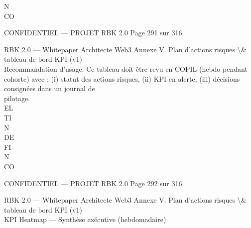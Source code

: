 N\\
CO\\
\vspace{0.5em}
\vspace{0.5em}
\vspace{0.5em}
\vspace{0.5em}
\begin{confidential}CONFIDENTIEL — PROJET RBK 2.0                                               Page 291 sur 316\end{confidential}
RBK 2.0 — Whitepaper Architecte Web3                                                                          Annexe V. Plan d’actions risques \textbackslash{}& tableau de bord KPI (v1)\\
\vspace{0.5em}
\vspace{0.5em}
Recommandation d’usage.         Ce tableau doit être revu en COPIL (hebdo pendant cohorte) avec : (i) statut des actions risques, (ii) KPI en alerte, (iii) décisions consignées dans un journal de\\
\vspace{0.5em}
pilotage.\\
\vspace{0.5em}
\vspace{0.5em}
\vspace{0.5em}
\vspace{0.5em}
EL\\
TI\\
N\\
DE\\
FI\\
N\\
CO\\
\vspace{0.5em}
\vspace{0.5em}
\vspace{0.5em}
\vspace{0.5em}
\begin{confidential}CONFIDENTIEL — PROJET RBK 2.0                                                Page 292 sur 316\end{confidential}
RBK 2.0 — Whitepaper Architecte Web3                           Annexe V. Plan d’actions risques \textbackslash{}& tableau de bord KPI (v1)\\
\vspace{0.5em}
\vspace{0.5em}
\vspace{0.5em}
KPI Heatmap — Synthèse exécutive (hebdomadaire)\\
